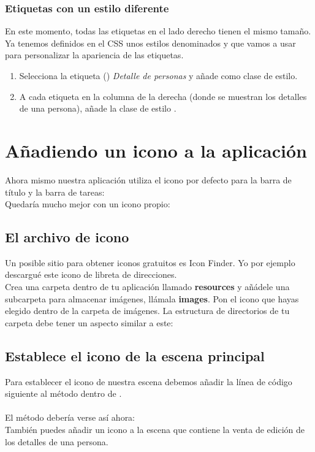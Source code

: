 \subsubsection*{Etiquetas con un estilo diferente}
En este momento, todas las etiquetas en el lado derecho tienen el mismo tamaño. 
Ya tenemos definidos en el CSS unos estilos denominados  y  
que vamos a usar para personalizar la apariencia de las etiquetas.
\begin{enumerate}
    \item Selecciona la etiqueta () \textit{Detalle de personas} y añade  
    como clase de estilo.
    \item A cada etiqueta en la columna de la derecha (donde se muestran los detalles 
    de una persona), añade la clase de estilo .
\end{enumerate}

\section{Añadiendo un icono a la aplicación}
Ahora mismo nuestra aplicación utiliza el icono por defecto para la barra de título y la barra de tareas:\\
Quedaría mucho mejor con un icono propio:\\
\subsection{El archivo de icono}
Un posible sitio para obtener iconos gratuitos es Icon Finder. %
Yo por ejemplo descargué este icono de libreta de direcciones.\\
Crea una carpeta dentro de tu aplicación llamado \textbf{resources} y añádele una subcarpeta 
para almacenar imágenes, llámala \textbf{images}. Pon el icono que hayas elegido dentro de la 
carpeta de imágenes. La estructura de directorios de tu carpeta debe tener un aspecto similar a este:
\subsection{Establece el icono de la escena principal}
Para establecer el icono de nuestra escena debemos añadir la línea de 
código siguiente al método  dentro de .\\
\\
El método  debería verse así ahora:\\
También puedes añadir un icono a la escena que contiene la venta de edición de los detalles de una persona.